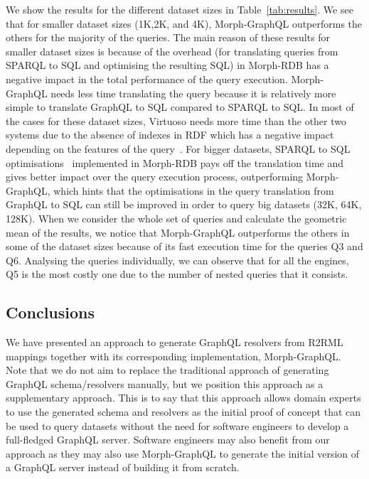 We show the results for the different dataset sizes in Table~\ref{tab:results}. We see that for smaller dataset sizes (1K,2K, and 4K), Morph-GraphQL outperforms the others for the majority of the queries. The main reason of these results for smaller dataset sizes is because of the overhead (for translating queries from SPARQL to SQL and optimising the resulting SQL) in Morph-RDB has a negative impact in the total performance of the query execution. Morph-GraphQL needs less time translating the query because it is relatively more simple to translate GraphQL to SQL compared to SPARQL to SQL. In most of the cases for these dataset sizes, Virtuoso needs more time than the other two systems due to the absence of indexes in RDF which has a negative impact depending on the features of the query~\citep{endris2019ontario}. For bigger datasets, SPARQL to SQL optimisations~\citep{priyatna2014formalisation} implemented in Morph-RDB pays off the translation time and gives better impact over the query execution process, outperforming Morph-GraphQL, which hints that the optimisations in the query translation from GraphQL to SQL can still be improved in order to query big datasets (32K, 64K, 128K). When we consider the whole set of queries and calculate the geometric mean of the results, we notice that Morph-GraphQL outperforms the others in some of the dataset sizes because of its fast execution time for the queries Q3 and Q6. Analysing the queries individually, we can observe that for all the engines, Q5 is the most costly one due to the number of nested queries that it consists. 


\subsection{Conclusions}
We have presented an approach to generate GraphQL resolvers from R2RML mappings together with its corresponding implementation, Morph-GraphQL. Note that we do not aim to replace the traditional approach of generating GraphQL schema/resolvers manually, but we position this approach as a supplementary approach. This is to say that this approach allows domain experts to use the generated schema and resolvers as the initial proof of concept that can be used to query datasets without the need for software engineers to develop a full-fledged GraphQL server. Software engineers may also benefit from our approach as they may also use Morph-GraphQL to generate the initial version of a GraphQL server instead of building it from scratch. 

